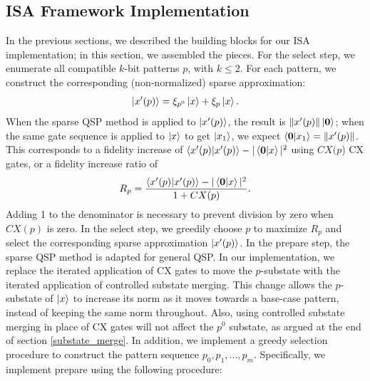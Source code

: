 \subsection{ISA Framework Implementation}
In the previous sections, we described the building blocks for our ISA
implementation; in this section, we assembled the pieces. For the select step, we enumerate all compatible $k$-bit patterns $p$, with 
$k \leq 2$. For each pattern, we construct the corresponding (non-normalized) sparse
approximation:
\begin{equation}
\mathinner{|{x'(p)}\rangle} = \xi_{p^0}\mathinner{|{x}\rangle} + \xi_p\mathinner{|{x}\rangle}.
\end{equation}
When the sparse QSP method is applied to $\mathinner{|{x'(p)}\rangle}$, the result is 
$\|x'(p)\| \mathinner{|{\mathbf{0}}\rangle}$; when the same gate sequence is applied to $\mathinner{|{x}\rangle}$ to get
$\mathinner{|{x_1}\rangle}$, we expect $\mathinner{\langle{\mathbf{0}|x_1}\rangle} = \|x'(p)\|$. This corresponds to a
fidelity increase of $\mathinner{\langle{x'(p)|x'(p)}\rangle} - |\mathinner{\langle{\mathbf{0}|x}\rangle}|^2$ using $CX(p$) CX gates, or a fidelity increase ratio of
\begin{equation}
R_p = \frac{\mathinner{\langle{x'(p)|x'(p)}\rangle} - |\mathinner{\langle{\mathbf{0}|x}\rangle}|^2}{1 + CX(p)}.
\end{equation}
Adding 1 to the denominator is necessary to prevent division by zero when $CX(p)$
is zero. In the select step, we greedily choose $p$ to maximize $R_p$ and select
the corresponding sparse approximation $\mathinner{|{x'(p)}\rangle}$. In the prepare step, the sparse QSP method is adapted for general QSP. In our 
implementation, we replace the iterated application of CX gates to move the
$p$-substate with the iterated application of controlled substate merging. This
change allows the $p$-substate of $\mathinner{|{x}\rangle}$ to increase its norm as it moves towards
a base-case pattern, instead of keeping the same norm throughout. Also, using
controlled substate merging in place of CX gates will not affect the $p^0$ substate,
as argued at the end of section \ref{substate_merge}. In addition, we implement a
greedy selection procedure to construct the pattern sequence $p_0, p_1, ..., p_m$.
Specifically, we implement prepare using the following procedure:
